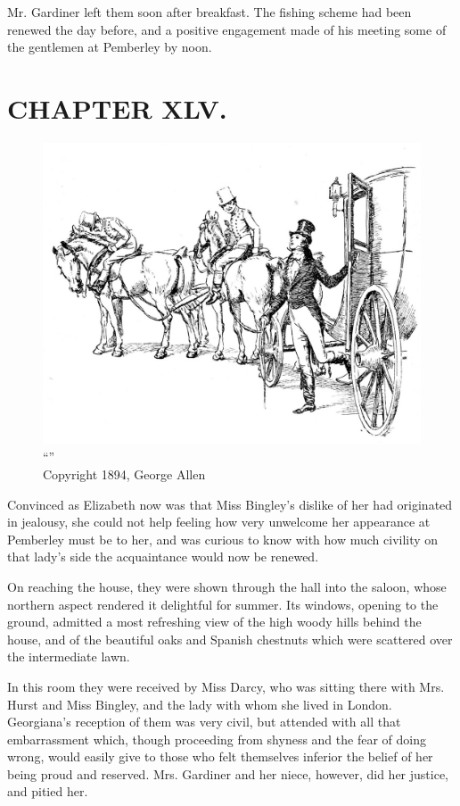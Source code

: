 Mr. Gardiner left them soon after breakfast. The fishing scheme had been renewed the day before, and a positive engagement made of his meeting some of the gentlemen at Pemberley by noon.



\chapter{CHAPTER XLV.}

\begin{figure}[htbp]
    \centering
    \includegraphics[width=\textwidth]{illustrations/i_031.jpg}
    \caption{“”\\ Copyright 1894, George Allen}
    \label{fig:image}
\end{figure}


Convinced as Elizabeth now was that Miss Bingley's dislike of her had originated in jealousy, she could not help feeling how very unwelcome her appearance at Pemberley must be to her, and was curious to know with how much civility on that lady's side the acquaintance would now be renewed.

On reaching the house, they were shown through the hall into the saloon, whose northern aspect rendered it delightful for summer. Its windows, opening to the ground, admitted a most refreshing view of the high woody hills behind the house, and of the beautiful oaks and Spanish chestnuts which were scattered over the intermediate lawn.

In this room they were received by Miss Darcy, who was sitting there with Mrs. Hurst and Miss Bingley, and the lady with whom she lived in London. Georgiana's reception of them was very civil, but attended with all that embarrassment which, though proceeding from shyness and the fear of doing wrong, would easily give to those who felt themselves inferior the belief of her being proud and reserved. Mrs. Gardiner and her niece, however, did her justice, and pitied her.

